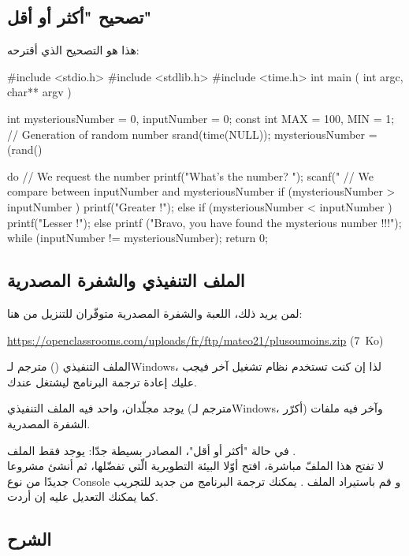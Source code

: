 \subsection{تصحيح "أكثر أو أقل"}

 هذا هو التصحيح الذي أقترحه:
 
\begin{Csource}
#include <stdio.h>
#include <stdlib.h>
#include <time.h>
int main ( int argc, char** argv )
{
	int mysteriousNumber = 0, inputNumber = 0;
	const int MAX = 100, MIN = 1;
	// Generation of random number
	srand(time(NULL));
	mysteriousNumber = (rand() %
	
	do
	{
		// We request the number
		printf("What's the number? ");
		scanf("%
		// We compare between inputNumber and mysteriousNumber
		if (mysteriousNumber > inputNumber )
		printf("Greater !\n\n");
		else if (mysteriousNumber < inputNumber )
		printf("Lesser !\n\n");
		else
		printf ("Bravo, you have found the mysterious number !!!\n\n");
	} while (inputNumber != mysteriousNumber);
	return 0;
}
\end{Csource}

\subsection{الملف التنفيذي والشفرة المصدرية}

 لمن يريد ذلك، اللعبة والشفرة المصدرية متوفّران للتنزيل من هنا:

\textenglish{\url{https://openclassrooms.com/uploads/fr/ftp/mateo21/plusoumoins.zip} \mbox{(7 Ko)}}

\begin{information}
الملف التنفيذي 
()
مترجم لـ\textenglish{Windows}، لذا إن كنت تستخدم نظام تشغيل آخر فيجب عليك إعادة ترجمة البرنامج ليشتغل عندك.
\end{information}

يوجد مجلّدان، واحد فيه الملف التنفيذي (مترجم لـ\textenglish{Windows}، أكرّر) وآخر فيه ملفات الشفرة المصدرية.

في حالة "أكثر أو أقل"، المصادر بسيطة جدّا: يوجد فقط الملف
.\\
لا تفتح هذا الملفّ مباشرة، افتح أوّلا البيئة التطويرية الّتي تفضّلها، ثم أنشئ مشروعا جديدًا من نوع 
\textenglish{Console}
و قم باستيراد الملف 
.
يمكنك ترجمة البرنامج من جديد للتجريب كما يمكنك التعديل عليه إن أردت.

\subsection{الشرح}


